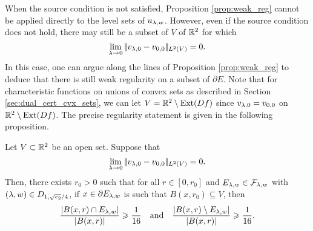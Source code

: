 When the source condition is not satisfied,  Proposition \ref{prop:weak_reg} cannot be applied directly to the level sets of $u_{\lambda,w}$.  However, even if the source condition does not hold, there may still be a subset of $V$ of $\mathbb{R}^2$ for which
$$
\lim_{\lambda\to 0}|\!| v_{\lambda,0}-v_{0,0} |\!|_{L^2(V)}= 0.$$ In this case, one can argue along the lines of Proposition \ref{prop:weak_reg} to deduce that  there is still weak regularity on a subset of $\partial E$.  Note that for  characteristic functions on unions of convex sets as described in Section \ref{sec:dual_cert_cvx_sets}, we can let $V=\mathbb{R}^2 \setminus \operatorname{Ext}(Df)$ since $v_{\lambda,0} = v_{0,0}$ on $\mathbb{R}^2\setminus \operatorname{Ext}(Df)$. The precise regularity statement is given in the following proposition.
\begin{prop}\label{prop:weak_reg_partial}
Let $V\subset \mathbb{R}^2$ be an open set. Suppose that
$$
\lim_{\lambda\to 0}|\!| v_{\lambda,0}-v_{0,0} |\!|_{L^2(V)} = 0.
$$
Then, there exists $r_0>0$ such that for all $r\in [0, r_0]$ and $E_{\lambda,w}\in\mathcal{F}_{\lambda,w}$ with $(\lambda,w)\in D_{1,\sqrt{c_2}/4}$, if $x\in \partial E_{\lambda,w}$ is such that $B(x,r_0)\subseteq V$, then
\begin{equation*}
 \frac{\left| B(x,r)\cap E_{\lambda,w} \right|}{\left| B(x,r) \right|}\geqslant \frac{1}{16}\quad \text{and} \quad \frac{\left| B(x,r)\setminus E_{\lambda,w} \right|}{\left| B(x,r) \right|} \geqslant \frac{1}{16}.
\end{equation*}
\end{prop}


